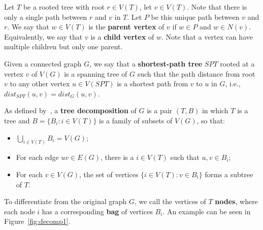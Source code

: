 Let \(T\) be a rooted tree with root \(r \in V(T)\), let \(v \in V(T)\). Note that there is only a single path between \(r\) and \(v\) in \(T\). Let \(P\) be this unique path between \(v\) and \(r\). We say that \(w \in V(T)\) is the \textbf{parent vertex} of \(v\) if \(w \in P\) and \(w \in N(v)\). Equivalently, we say that \(v\) is a \textbf{child vertex} of \(w\). Note that a vertex can have multiple children but only one parent.

Given a connected graph \(G\), we say that a \textbf{shortest-path tree} \(SPT\) rooted at a vertex \(v\) of \(V(G)\) is a spanning tree of \(G\) such that the path distance from root \(v\) to any other vertex \(u \in V(SPT)\) is a shortest path from \(v\) to \(u\) in \(G\), i.e., \(dist_{SPT}(u, v) = dist_{G}(u, v)\).

As defined by~\cite{ROBERTSON1986309}, a \textbf{tree decomposition} of \(G\) is a pair \((T, B)\) in which \(T\) is a tree and \(B = \{B_i \colon i \in V(T)\}\) is a family of subsets of \(V(G)\), so that:

\begin{itemize}
    \item \(\bigcup_{i \in V(T)} B_i = V(G)\);
    \item For each edge \(uv \in E(G)\), there is a \(i \in V(T)\) such that \(u, v \in B_i\);
    \item For each \(v \in V(G)\), the set of vertices \(\{i \in V(T) \colon v \in B_i\}\) forms a subtree of \(T\).
\end{itemize}

To differentiate from the original graph \(G\), we call the vertices of \(T\) \textbf{nodes}, where each node \(i\) has a corresponding \textbf{bag} of vertices \(B_i\). An example can be seen in Figure~\ref{fig:decomp1}.

